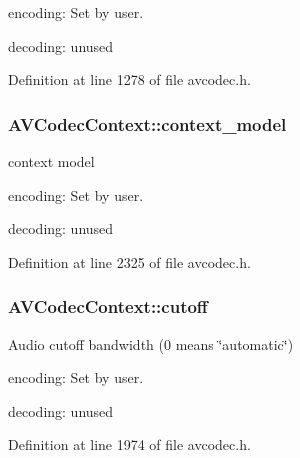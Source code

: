 \begin{DoxyItemize}
\item encoding\+: Set by user.
\item decoding\+: unused 
\end{DoxyItemize}

Definition at line 1278 of file avcodec.\+h.

\subsubsection[{\texorpdfstring{context\+\_\+model}{context_model}}]{ A\+V\+Codec\+Context\+::context\+\_\+model}\hypertarget{struct_a_v_codec_context_aac92b6deba952dc10e0b9ab0b6114fce}{}\label{struct_a_v_codec_context_aac92b6deba952dc10e0b9ab0b6114fce}
context model
\begin{DoxyItemize}
\item encoding\+: Set by user.
\item decoding\+: unused 
\end{DoxyItemize}

Definition at line 2325 of file avcodec.\+h.

\subsubsection[{\texorpdfstring{cutoff}{cutoff}}]{ A\+V\+Codec\+Context\+::cutoff}\hypertarget{struct_a_v_codec_context_ae2cc92cf09edd8fdf95018bf5e08b910}{}\label{struct_a_v_codec_context_ae2cc92cf09edd8fdf95018bf5e08b910}
Audio cutoff bandwidth (0 means \char`\"{}automatic\char`\"{})
\begin{DoxyItemize}
\item encoding\+: Set by user.
\item decoding\+: unused 
\end{DoxyItemize}

Definition at line 1974 of file avcodec.\+h.

